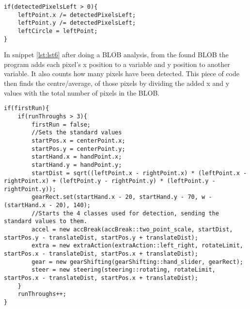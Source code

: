 \begin{lstlisting}[caption=Post BLOB analysis, label=lst:lst6]
if(detectedPixelsLeft > 0){
    leftPoint.x /= detectedPixelsLeft;
    leftPoint.y /= detectedPixelsLeft;
    leftCircle = leftPoint;
}
\end{lstlisting}

In snippet \ref{lst:lst6} after doing a BLOB analysis, from the found BLOB the program adds each pixel’s x position to a variable and y position to another variable. 
It also counts how many pixels have been detected. 
This piece of code then finds the centre/average, of those pixels by dividing the added x and y values with the total number of pixels in the BLOB.
\bigskip

\pagebreak[4]
\begin{lstlisting}[caption=Update, label=lst:lst7]
if(firstRun){
    if(runThroughs > 3){
        firstRun = false;
        //Sets the standard values
        startPos.x = centerPoint.x;
        startPos.y = centerPoint.y;
        startHand.x = handPoint.x;
        startHand.y = handPoint.y;
        startDist = sqrt((leftPoint.x - rightPoint.x) * (leftPoint.x - rightPoint.x) + (leftPoint.y - rightPoint.y) * (leftPoint.y - rightPoint.y));
        gearRect.set(startHand.x - 20, startHand.y - 70, w - (startHand.x - 20), 140);
        //Starts the 4 classes used for detection, sending the standard values to them.
        accel = new accBreak(accBreak::two_point_scale, startDist, startPos.y - translateDist, startPos.y + translateDist);
        extra = new extraAction(extraAction::left_right, rotateLimit, startPos.x - translateDist, startPos.x + translateDist);
        gear = new gearShifting(gearShifting::hand_slider, gearRect);
        steer = new steering(steering::rotating, rotateLimit, startPos.x - translateDist, startPos.x + translateDist);
    }
    runThroughs++;
}
\end{lstlisting}

